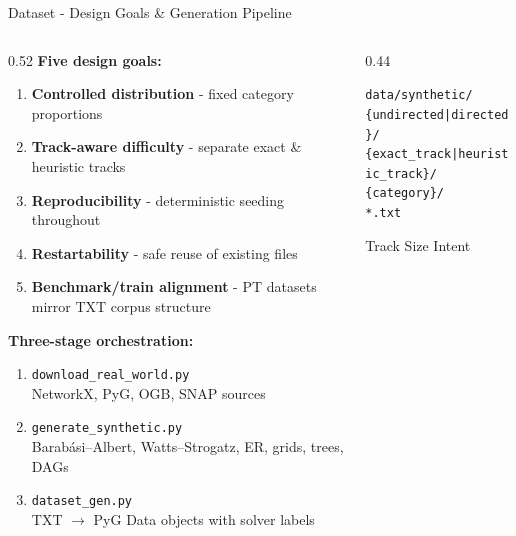 \documentclass[aspectratio=169]{beamer}
\newcommand{\highlight}[1]{\textcolor{midblue}{\textbf{#1}}}
\renewcommand{\footnotesize}{\tiny}
\begin{document}
\begin{frame}{Dataset - Design Goals \& Generation Pipeline}
	\tiny
	\begin{columns}[T]
		\begin{column}{0.52\textwidth}
			\textbf{Five design goals:}
			\begin{enumerate}\setlength\itemsep{2pt}
				\item \highlight{Controlled distribution} - fixed category proportions
				\item \highlight{Track-aware difficulty} - separate exact \& heuristic tracks
				\item \highlight{Reproducibility} - deterministic seeding throughout
				\item \highlight{Restartability} - safe reuse of existing files
				\item \highlight{Benchmark/train alignment} - PT datasets mirror
				      TXT corpus structure
			\end{enumerate}
			\vspace{6pt}
			\textbf{Three-stage orchestration:}
			\begin{enumerate}
				\item \texttt{download\_real\_world.py}\\
				      {\footnotesize NetworkX, PyG, OGB, SNAP sources}
				\item \texttt{generate\_synthetic.py}\\
				      {\footnotesize Barabási–Albert, Watts–Strogatz, ER, grids, trees, DAGs}
				\item \texttt{dataset\_gen.py}\\
				      {\footnotesize TXT $\to$ PyG Data objects with solver labels}
			\end{enumerate}
		\end{column}
		\begin{column}{0.44\textwidth}
			\begin{tcolorbox}[mybox,title=Directory Contract]
				\footnotesize
				\texttt{data/synthetic/}\\
				\quad\texttt{\{undirected|directed\}/}\\
				\quad\quad\texttt{\{exact\_track|heuristic\_track\}/}\\
				\quad\quad\quad\texttt{\{category\}/}\\
				\quad\quad\quad\quad\texttt{*.txt}
			\end{tcolorbox}
			\vspace{6pt}
			\begin{block}{Track Size Intent}

\end{block}
\end{column}
\end{columns}
\end{frame}
\end{document}

